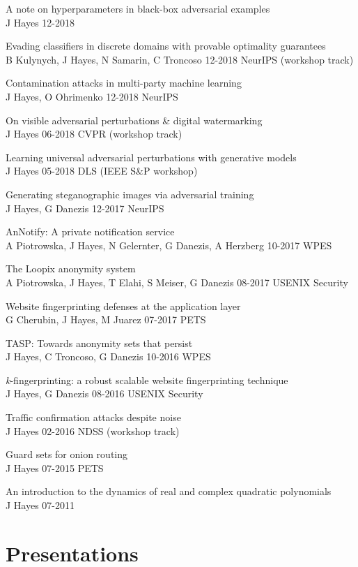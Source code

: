 \documentclass[margin,line]{res}
\begin{document}
\begin{resume}
A note on hyperparameters in black-box adversarial examples\\
J Hayes 12-2018  

Evading classifiers in discrete domains with provable optimality guarantees\\
B Kulynych, J Hayes, N Samarin, C Troncoso 12-2018 NeurIPS (workshop track)  

Contamination attacks in multi-party machine learning\\
J Hayes, O Ohrimenko 12-2018 NeurIPS 

On visible adversarial perturbations \& digital watermarking\\
J Hayes 06-2018 CVPR (workshop track) 

Learning universal adversarial perturbations with generative models\\
J Hayes 05-2018 DLS (IEEE S\&P workshop)  

Generating steganographic images via adversarial training\\
J Hayes, G Danezis 12-2017 NeurIPS  

AnNotify: A private notification service\\
A Piotrowska, J Hayes, N Gelernter, G Danezis, A Herzberg 10-2017 WPES  

The Loopix anonymity system\\
A Piotrowska, J Hayes, T Elahi, S Meiser, G Danezis 08-2017 USENIX Security  

Website fingerprinting defenses at the application layer\\
G Cherubin, J Hayes, M Juarez 07-2017 PETS  

TASP: Towards anonymity sets that persist\\
J Hayes, C Troncoso, G Danezis 10-2016 WPES  

\emph{k}-fingerprinting: a robust scalable website fingerprinting technique\\
J Hayes, G Danezis 08-2016 USENIX Security  

Traffic confirmation attacks despite noise\\
J Hayes 02-2016 NDSS (workshop track)  

Guard sets for onion routing\\
J Hayes 07-2015 PETS  

An introduction to the dynamics of real and complex quadratic polynomials\\
J Hayes 07-2011  

\section{\sc Presentations}


\end{resume}
\end{document}
